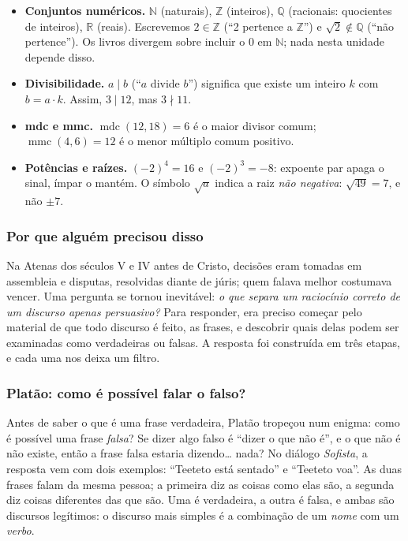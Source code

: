 \begin{minimo}
\begin{itemize}[leftmargin=1.2em]
  \item \textbf{Conjuntos numéricos.} $\mathbb{N}$ (naturais), $\mathbb{Z}$ (inteiros), $\mathbb{Q}$ (racionais: quocientes de inteiros), $\mathbb{R}$ (reais). Escrevemos $2 \in \mathbb{Z}$ (\enquote{2 pertence a $\mathbb{Z}$}) e $\sqrt{2} \notin \mathbb{Q}$ (\enquote{não pertence}). Os livros divergem sobre incluir o 0 em $\mathbb{N}$; nada nesta unidade depende disso.
  \item \textbf{Divisibilidade.} $a \mid b$ (\enquote{$a$ divide $b$}) significa que existe um inteiro $k$ com $b = a\cdot k$. Assim, $3 \mid 12$, mas $3 \nmid 11$.
  \item \textbf{mdc e mmc.} $\operatorname{mdc}(12,18)=6$ é o maior divisor comum; $\operatorname{mmc}(4,6)=12$ é o menor múltiplo comum positivo.
  \item \textbf{Potências e raízes.} $(-2)^4=16$ e $(-2)^3=-8$: expoente par apaga o sinal, ímpar o mantém. O símbolo $\sqrt{a}$ indica a raiz \emph{não negativa}: $\sqrt{49}=7$, e não $\pm 7$.
\end{itemize}
\end{minimo}

\DeOndeVem

\subsubsection{Por que alguém precisou disso}
Na Atenas dos séculos V e IV antes de Cristo, decisões eram tomadas em assembleia e disputas, resolvidas diante de júris; quem falava melhor costumava vencer. Uma pergunta se tornou inevitável: \emph{o que separa um raciocínio correto de um discurso apenas persuasivo?} Para responder, era preciso começar pelo material de que todo discurso é feito, as frases, e descobrir quais delas podem ser examinadas como verdadeiras ou falsas. A resposta foi construída em três etapas, e cada uma nos deixa um filtro.

\subsubsection{Platão: como é possível falar o falso?}
Antes de saber o que é uma frase verdadeira, Platão tropeçou num enigma: como é possível uma frase \emph{falsa}? Se dizer algo falso é \enquote{dizer o que não é}, e o que não é não existe, então a frase falsa estaria dizendo\ldots{} nada? No diálogo \emph{Sofista}, a resposta vem com dois exemplos: \enquote{Teeteto está sentado} e \enquote{Teeteto voa}. As duas frases falam da mesma pessoa; a primeira diz as coisas como elas são, a segunda diz coisas diferentes das que são. Uma é verdadeira, a outra é falsa, e ambas são discursos legítimos: o discurso mais simples é a combinação de um \emph{nome} com um \emph{verbo}.

